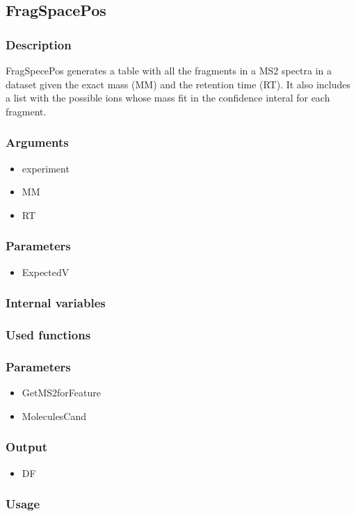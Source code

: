 \subsection{FragSpacePos}
\subsubsection{Description}
FragSpecePos generates a table with all the fragments in a MS2 spectra in a dataset given the exact mass (MM) and the retention time (RT). It also includes a list with the possible ions whose mass fit in the confidence interal for each fragment.
\subsubsection{Arguments}
\begin{itemize}
\item experiment
\item MM
\item RT
\end{itemize}
\subsubsection{Parameters}
\begin{itemize}
\item ExpectedV
\end{itemize}
\subsubsection{Internal variables}
\subsubsection{Used functions}
\subsubsection{Parameters}
\begin{itemize}
\item GetMS2forFeature
\item MoleculesCand
\end{itemize}
\subsubsection{Output}
\begin{itemize}
\item DF
\end{itemize}
\subsubsection{Usage}
